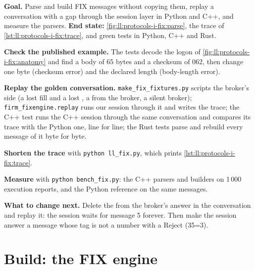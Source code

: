 \begin{tutorial}
\textbf{Goal.} Parse and build FIX messages without copying them, replay a conversation with a gap through the session layer
in Python and C++, and measure the parsers. \textbf{End state:} \cref{fig:ll:protocols-i-fix:parse}, the trace of
\cref{lst:ll:protocols-i-fix:trace}, and green tests in Python, C++ and Rust.
\begin{tutsteps}
\item \textbf{Check the published example.} The tests decode the logon of \cref{fig:ll:protocols-i-fix:anatomy} and find a
body of 65 bytes and a checksum of 062, then change one byte (checksum error) and the declared length (body-length error).
\item \textbf{Replay the golden conversation.} \texttt{make\_fix\_fixtures.py} scripts the broker's side (a lost fill and a
lost , a  from the broker, a silent broker); \texttt{firm\_fixengine.replay} runs our session through
it and writes the trace; the C++ test runs the C++ session through the same conversation and compares its trace with the
Python one, line for line; the Rust tests parse and rebuild every message of it byte for byte.
\item \textbf{Shorten the trace} with \texttt{python ll\_fix.py}, which prints \cref{lst:ll:protocols-i-fix:trace}.
\item \textbf{Measure} with \texttt{python bench\_fix.py}: the C++ parsers and builders on 1\,000 execution reports, and the
Python reference on the same messages.
\end{tutsteps}
\textbf{What to change next.} Delete the  from the broker's answer in the conversation and replay it: the session
waits for message 5 forever. Then make the session answer a message whose tag is not a number with a Reject (35=3).
\end{tutorial}

\section{Build: the FIX engine}\label{bld:ll:protocols-i-fix:fixengine}

